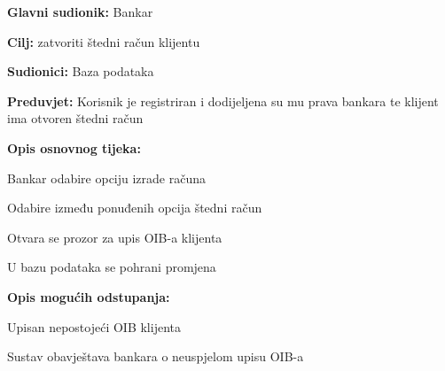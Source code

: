             \noindent {}
            \begin{packed_item}
            
              \item \textbf{Glavni sudionik: }Bankar
              \item  \textbf{Cilj:} zatvoriti štedni račun klijentu
              \item  \textbf{Sudionici:} Baza podataka
              \item  \textbf{Preduvjet:} Korisnik je registriran i dodijeljena su mu prava bankara te klijent ima otvoren štedni račun
              \item  \textbf{Opis osnovnog tijeka:}
              
              \item[] \begin{packed_enum}
            
                \item Bankar odabire opciju izrade računa 
                \item Odabire između  ponuđenih opcija štedni račun
                \item Otvara se prozor za upis OIB-a klijenta
                \item U bazu podataka se pohrani promjena
              \end{packed_enum}
              
              \item  \textbf{Opis mogućih odstupanja:}
              
              \item[] \begin{packed_item}
            
                \item[3.a] Upisan nepostojeći OIB klijenta
                \item[] \begin{packed_enum}
                  
                  \item Sustav obavještava bankara o neuspjelom upisu OIB-a
                  
                \end{packed_enum}
                
              \end{packed_item}
            \end{packed_item}
            
